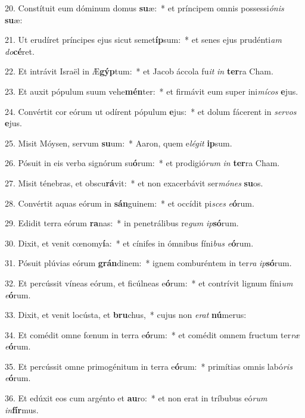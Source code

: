 20. Constítuit eum dóminum domus \textbf{su}æ:~*  et príncipem omnis possessi\textit{ó}\textit{nis} \textbf{su}æ:\

21. Ut erudíret príncipes ejus sicut semet\textbf{íp}sum:~*  et senes ejus prudénti\textit{am} \textit{do}\textbf{cé}ret.\

22. Et intrávit Israël in Æ\textbf{gýp}tum:~*  et Jacob áccola fu\textit{it} \textit{in} \textbf{ter}ra Cham.\

23. Et auxit pópulum suum vehe\textbf{mén}ter:~*  et firmávit eum super ini\textit{mí}\textit{cos} \textbf{e}jus.\

24. Convértit cor eórum ut odírent pópulum \textbf{e}jus:~*  et dolum fácerent in \textit{ser}\textit{vos} \textbf{e}jus.\

25. Misit Móysen, servum \textbf{su}um:~*  Aaron, quem e\textit{lé}\textit{git} \textbf{ip}sum.\

26. Pósuit in eis verba signórum su\textbf{ó}rum:~*  et prodigió\textit{rum} \textit{in} \textbf{ter}ra Cham.\

27. Misit ténebras, et obscu\textbf{rá}vit:~*  et non exacerbávit ser\textit{mó}\textit{nes} \textbf{su}os.\

28. Convértit aquas eórum in \textbf{sán}guinem:~*  et occídit pi\textit{sces} \textit{e}\textbf{ó}rum.\

29. Edidit terra eórum \textbf{ra}nas:~*  in penetrálibus re\textit{gum} \textit{ip}\textbf{só}rum.\

30. Dixit, et venit cœnomy\textbf{í}a:~*  et cínifes in ómnibus fíni\textit{bus} \textit{e}\textbf{ó}rum.\

31. Pósuit plúvias eórum \textbf{grán}dinem:~*  ignem comburéntem in ter\textit{ra} \textit{ip}\textbf{só}rum.\

32. Et percússit víneas eórum, et ficúlneas e\textbf{ó}rum:~*  et contrívit lignum fíni\textit{um} \textit{e}\textbf{ó}rum.\

33. Dixit, et venit locústa, et \textbf{bru}chus,~*  cujus non \textit{e}\textit{rat} \textbf{nú}merus:\

34. Et comédit omne fœnum in terra e\textbf{ó}rum:~*  et comédit omnem fructum ter\textit{ræ} \textit{e}\textbf{ó}rum.\

35. Et percússit omne primogénitum in terra e\textbf{ó}rum:~*  primítias omnis labó\textit{ris} \textit{e}\textbf{ó}rum.\

36. Et edúxit eos cum argénto et \textbf{au}ro:~*  et non erat in tríbubus eó\textit{rum} \textit{in}\textbf{fír}mus.\

